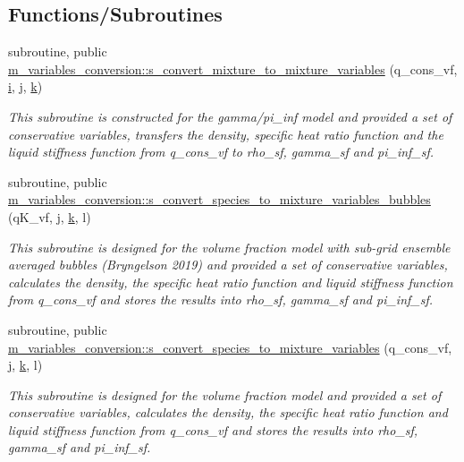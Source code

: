 \subsection*{Functions/\+Subroutines}
\begin{DoxyCompactItemize}
\item 
subroutine, public \hyperlink{namespacem__variables__conversion_a272a4452dad903bf877b475d322b921a}{m\+\_\+variables\+\_\+conversion\+::s\+\_\+convert\+\_\+mixture\+\_\+to\+\_\+mixture\+\_\+variables} (q\+\_\+cons\+\_\+vf, \hyperlink{m__data__output_8f90_aaea4baed8fd8b780f6938f0dc1fb0f72}{i}, \hyperlink{m__data__output_8f90_aeadbc0ce9b66517f8fde156199772ec1}{j}, \hyperlink{m__data__output_8f90_af22c486581933c52df7d4aa306382074}{k})
\begin{DoxyCompactList}\small\item\em This subroutine is constructed for the gamma/pi\+\_\+inf model and provided a set of conservative variables, transfers the density, specific heat ratio function and the liquid stiffness function from q\+\_\+cons\+\_\+vf to rho\+\_\+sf, gamma\+\_\+sf and pi\+\_\+inf\+\_\+sf. \end{DoxyCompactList}\item 
subroutine, public \hyperlink{namespacem__variables__conversion_acf8095b9ff1a0e61e857cd39cc4b87cc}{m\+\_\+variables\+\_\+conversion\+::s\+\_\+convert\+\_\+species\+\_\+to\+\_\+mixture\+\_\+variables\+\_\+bubbles} (q\+K\+\_\+vf, \hyperlink{m__data__output_8f90_aeadbc0ce9b66517f8fde156199772ec1}{j}, \hyperlink{m__data__output_8f90_af22c486581933c52df7d4aa306382074}{k}, l)
\begin{DoxyCompactList}\small\item\em This subroutine is designed for the volume fraction model with sub-\/grid ensemble averaged bubbles (Bryngelson 2019) and provided a set of conservative variables, calculates the density, the specific heat ratio function and liquid stiffness function from q\+\_\+cons\+\_\+vf and stores the results into rho\+\_\+sf, gamma\+\_\+sf and pi\+\_\+inf\+\_\+sf. \end{DoxyCompactList}\item 
subroutine, public \hyperlink{namespacem__variables__conversion_ae1178f49330fb2bccdc60a6076432626}{m\+\_\+variables\+\_\+conversion\+::s\+\_\+convert\+\_\+species\+\_\+to\+\_\+mixture\+\_\+variables} (q\+\_\+cons\+\_\+vf, \hyperlink{m__data__output_8f90_aeadbc0ce9b66517f8fde156199772ec1}{j}, \hyperlink{m__data__output_8f90_af22c486581933c52df7d4aa306382074}{k}, l)
\begin{DoxyCompactList}\small\item\em This subroutine is designed for the volume fraction model and provided a set of conservative variables, calculates the density, the specific heat ratio function and liquid stiffness function from q\+\_\+cons\+\_\+vf and stores the results into rho\+\_\+sf, gamma\+\_\+sf and pi\+\_\+inf\+\_\+sf. \end{DoxyCompactList}\item 

\end{DoxyCompactItemize}
